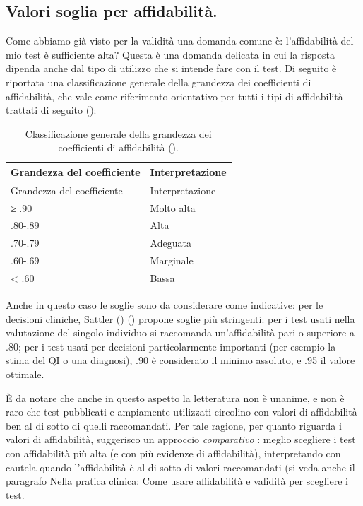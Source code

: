 \documentclass[
  italian,
  letterpaper,
  paper=A4,
  headinclude=on,
  footinclude=on,
  12pt]{scrbook}
\begin{document}
\subsection{Valori soglia per
affidabilità.}\label{valori-soglia-per-affidabilituxe0.}

Come abbiamo già visto per la validità una domanda comune è:
l'affidabilità del mio test è sufficiente alta? Questa è una domanda
delicata in cui la risposta dipenda anche dal tipo di utilizzo che si
intende fare con il test. Di seguito è riportata una classificazione
generale della grandezza dei coefficienti di affidabilità, che vale come
riferimento orientativo per tutti i tipi di affidabilità trattati di
seguito (\cite{slick2006psychometrics}):

\begin{longtable}[]{@{}ll@{}}
\caption{Classificazione generale della grandezza dei coefficienti di
affidabilità
(\cite{slick2006psychometrics}).}\label{tbl-affidabilita-generale}\tabularnewline
\toprule\noalign{}
Grandezza del coefficiente & Interpretazione \\
\midrule\noalign{}
\endfirsthead
\toprule\noalign{}
Grandezza del coefficiente & Interpretazione \\
\midrule\noalign{}
\endhead
\bottomrule\noalign{}
\endlastfoot
≥ .90 & Molto alta \\
.80-.89 & Alta \\
.70-.79 & Adeguata \\
.60-.69 & Marginale \\
\textless{} .60 & Bassa \\
\end{longtable}

Anche in questo caso le soglie sono da considerare come indicative: per
le decisioni cliniche, Sattler (\citeyear{sattler2001assessment})
(\cite{slick2006psychometrics}) propone soglie più stringenti: per i
test usati nella valutazione del singolo individuo si raccomanda
un'affidabilità pari o superiore a .80; per i test usati per decisioni
particolarmente importanti (per esempio la stima del QI o una diagnosi),
.90 è considerato il minimo assoluto, e .95 il valore ottimale.

È da notare che anche in questo aspetto la letteratura non è unanime, e
non è raro che test pubblicati e ampiamente utilizzati circolino con
valori di affidabilità ben al di sotto di quelli raccomandati. Per tale
ragione, per quanto riguarda i valori di affidabilità, suggerisco un
approccio \emph{comparativo} : meglio scegliere i test con affidabilità
più alta (e con più evidenze di affidabilità), interpretando con cautela
quando l'affidabilità è al di sotto di valori raccomandati (si veda
anche il paragrafo \hyperref[prat-clin-aff-valux5cux257D]{Nella pratica
clinica: Come usare affidabilità e validità per scegliere i test}.
\end{document}
